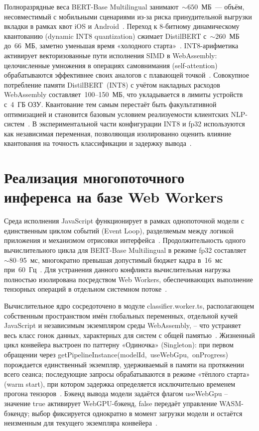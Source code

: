 Полноразрядные веса BERT-Base Multilingual занимают~${\sim}650$~МБ~— объём, несовместимый с мобильными сценариями из-за риска принудительной выгрузки вкладки в рамках квот iOS и Android~\cite{gholami2021quantization, dettmers2022llmint8}. Переход к 8-битному динамическому квантованию (dynamic INT8 quantization) сжимает DistilBERT с~${\sim}260$~МБ до~66~МБ, заметно уменьшая время «холодного старта»~\cite{husom2025sustainable, chen2025intfp}. INT8-арифметика активирует векторизованные пути исполнения SIMD в WebAssembly: целочисленные умножения в операциях самовнимания (self-attention) обрабатываются эффективнее своих аналогов с плавающей точкой~\cite{wang2024anatomizing, jia2024empowering}. Совокупное потребление памяти DistilBERT~(INT8) с учётом накладных расходов WebAssembly составляет~100–150~МБ, что укладывается в лимиты устройств с~4~ГБ ОЗУ. Квантование тем самым перестаёт быть факультативной оптимизацией и становится базовым условием реализуемости клиентских NLP-систем~\cite{husom2025sustainable}. В экспериментальной части конфигурации INT8 и fp32 используются как независимая переменная, позволяющая изолированно оценить влияние квантования на точность классификации и задержку вывода~\cite{gholami2021quantization}.

\section{Реализация многопоточного инференса на базе Web Workers}
\label{sec:реализация_многопоточного_инференса_на_базе_web_workers}

Среда исполнения JavaScript функционирует в рамках однопоточной модели с единственным циклом событий (Event Loop), разделяемым между логикой приложения и механизмом отрисовки интерфейса~\cite{wang2024anatomizing}. Продолжительность одного вычислительного цикла для BERT-Base Multilingual в режиме fp32 составляет~${\sim}80$–95~мс, многократно превышая допустимый бюджет кадра в~16~мс при~60~Гц~\cite{jia2024empowering}. Для устранения данного конфликта вычислительная нагрузка полностью изолирована посредством Web Workers, обеспечивающих выполнение тензорных операций в отдельном системном потоке~\cite{ruan2024webllm}.

Вычислительное ядро сосредоточено в модуле classifier.worker.ts, располагающем собственным пространством имён глобальных переменных, отдельной кучей JavaScript и независимым экземпляром среды WebAssembly, – что устраняет весь класс гонок данных, характерных для систем с общей памятью~\cite{wang2024anatomizing}. Жизненный цикл конвейера выстроен по паттерну «Одиночка» (Singleton): при первом обращении через getPipelineInstance(modelId,~useWebGpu,~onProgress) порождается единственный экземпляр, удерживаемый в памяти на протяжении всего сеанса; последующие запросы обрабатываются в режиме «тёплого старта» (warm start), при котором задержка определяется исключительно временем прогона тензоров~\cite{husom2025sustainable}. Бэкенд вывода модели задаётся флагом useWebGpu – значение true активирует WebGPU-бэкенд, false передаёт управление WASM-бэкенду; выбор фиксируется однократно в момент загрузки модели и остаётся неизменным для текущего экземпляра конвейера~\cite{ruan2024webllm}.

